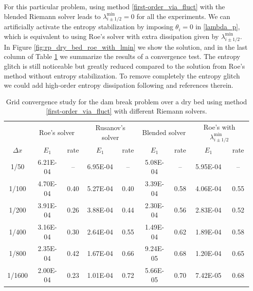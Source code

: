\documentclass[preprint, 11pt]{article}
\begin{document}
For this particular problem, using method \eqref{first-order_via_fluct} with
the blended Riemann solver leads to $\lambda_{i\pm 1/2}^{\min}=0$ for all the experiments.
We can artificially activate the entropy stabilization by imposing $\theta_{i}=0$ in \eqref{lambda_p},
which is equivalent to using Roe's solver with extra dissipation given by $\lambda_{i\pm 1/2}^{\min}$.
In Figure \ref{fig:rp_dry_bed_roe_with_lmin} we show the solution,
and in the last column of Table \ref{table:rp_dry_bed} we summarize the results of a convergence test.
The entropy glitch is still noticeable but greatly reduced compared to the
solution from Roe's method without entropy stabilization.
To remove completely the entropy glitch we could add high-order entropy dissipation following \cite{tadmor2003entropy}
and references therein.

\begin{table}[!ht]\scriptsize
  \begin{center}
    \begin{tabular}{||c||c|c||c|c||c|c||c|c||} \hline
      & \multicolumn{2}{c||}{Roe's solver}
      &\multicolumn{2}{c||}{Rusanov's solver}
      &\multicolumn{2}{c||}{Blended solver}
      &\multicolumn{2}{c||}{Roe's with $\lambda_{i\pm 1/2}^{\min}$} \\ \cline{2-9}
      $\Delta x$ & $E_1$ & rate & $E_1$ & rate & $E_1$ & rate & $E_1$ & rate \\ \hline
      1/50   & 6.21E-04 &  --  & 6.95E-04 &   -- & 5.08E-04 & --   & 5.95E-04 & --   \\
      1/100  & 4.70E-04 & 0.40 & 5.27E-04 & 0.40 & 3.39E-04 & 0.58 & 4.06E-04 & 0.55 \\
      1/200  & 3.91E-04 & 0.26 & 3.88E-04 & 0.44 & 2.30E-04 & 0.56 & 2.83E-04 & 0.52 \\
      1/400  & 3.16E-04 & 0.30 & 2.64E-04 & 0.55 & 1.49E-04 & 0.62 & 1.89E-04 & 0.58 \\
      1/800  & 2.35E-04 & 0.42 & 1.67E-04 & 0.66 & 9.24E-05 & 0.68 & 1.20E-04 & 0.65 \\
      1/1600 & 2.00E-04 & 0.23 & 1.01E-04 & 0.72 & 5.66E-05 & 0.70 & 7.42E-05 & 0.68 \\ \hline
    \end{tabular}
    \caption{Grid convergence study for the dam break problem over a dry bed
      using method \eqref{first-order_via_fluct} with different Riemann solvers.\label{table:rp_dry_bed}}
  \end{center}
\end{table}
\end{document}
